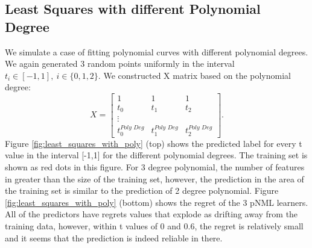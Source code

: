 \documentclass[conference,letterpaper]{IEEEtran}
\begin{document}
\subsection{Least Squares with different Polynomial Degree} \label{sec:least_sqaures_with_pol_deg}
We simulate a case of fitting polynomial curves with different polynomial degrees. We again generated 3 random points uniformly in the interval $t_i \in [-1, 1],\ i \in \{0,1,2\}$.
We constructed X matrix based on the polynomial degree:
\begin{equation}
X = 
\begin{bmatrix}
1 & 1 & 1 \\
t_0 & t_1 & t_2 \\
\vdots \\
t_0^{\textit{Poly Deg}} & t_1^{\textit{Poly Deg}} & t_2^{\textit{Poly Deg}} 
\end{bmatrix}.
\end{equation}
Figure \ref{fig:least_squares_with_poly} (top) shows the predicted label for every t value in the interval [-1,1] for the different polynomial degrees. The training set is shown as red dots in this figure. 
For 3 degree polynomial, the number of features in greater than the size of the training set, however, the prediction in the area of the training set is similar to the prediction of 2 degree polynomial.
Figure \ref{fig:least_squares_with_poly} (bottom) shows the regret of the 3 pNML learners. All of the predictors have regrets values that explode as drifting away from the training data, however, within t values of 0 and 0.6, the regret is relatively small and it seems that the prediction is indeed reliable in there.
\end{document}
